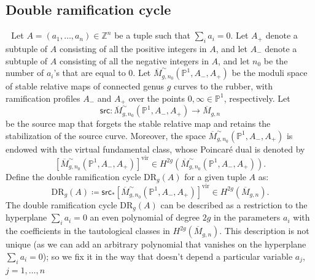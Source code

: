 \documentclass{amsart}
\numberwithin{equation}{section} %
\theoremstyle{plain}
\theoremstyle{remark}
\begin{document}
\subsection{Double ramification cycle}
﻿
\label{sec: DR definition}
﻿
Let $A = (a_1, \ldots, a_n) \in \mathbb{Z}^n$ be a tuple such that $\sum_i a_i = 0$. Let $A_+$ denote a subtuple of $A$ consisting of all the positive integers in $A$, and let $A_-$ denote a subtuple of $A$ consisting of all the negative integers in $A$, and let $n_0$ be the number of $a_i$'s that are equal to $0$. Let $\overline{M}^\sim_{g,n_0}(\mathbb{P}^1, A_-, A_+)$ be the moduli space of stable relative maps of connected genus $g$ curves to the rubber, with ramification profiles $A_-$ and $A_+$ over the points $0, \infty \in \mathbb{P}^1$, respectively. Let
\begin{equation*}
	\mathsf{src} \colon \overline{M}^\sim_{g,n_0}(\mathbb{P}^1, A_-, A_+) \rightarrow \overline{M}_{g,n}
\end{equation*}
be the source map that forgets the stable relative map and retains the stabilization of the source curve. Moreover, the space $\overline{M}^\sim_{g,n_0}(\mathbb{P}^1, A_-, A_+)$ is endowed with the virtual fundamental class, whose Poincar\'e dual is denoted by
\begin{equation*}
	\left[\overline{M}^\sim_{g,n_0}(\mathbb{P}^1, A_-, A_+)\right]^{\mathrm{vir}} \in H^{2g}(\overline{M}^\sim_{g,n_0}(\mathbb{P}^1, A_-, A_+)).
\end{equation*}
Define the double ramification cycle $\mathrm{DR}_g(A)$ for a given tuple $A$ as:
\begin{equation*}
	\mathrm{DR}_g(A) \coloneqq \mathsf{src}_*\left[\overline{M}^\sim_{g,n_0}(\mathbb{P}^1, A_-, A_+)\right]^{\mathrm{vir}} \in H^{2g}(\overline{M}_{g,n}).
\end{equation*}
﻿
﻿
The double ramification cycle $\mathrm{DR}_g(A)$ can be described as a restriction to the hyperplane $\sum_i a_i=0$ an even polynomial of degree $2g$ in the parameters $a_i$ with the coefficients in the tautological classes in $H^{2g}(\overline{M}_{g,n})$. This description is not unique (as we can add an arbitrary polynomial that vanishes on the hyperplane $\sum_i a_i=0$); so we fix it in the way that doesn't depend a particular variable $a_j$, $j=1,\dots,n$
\end{document}

